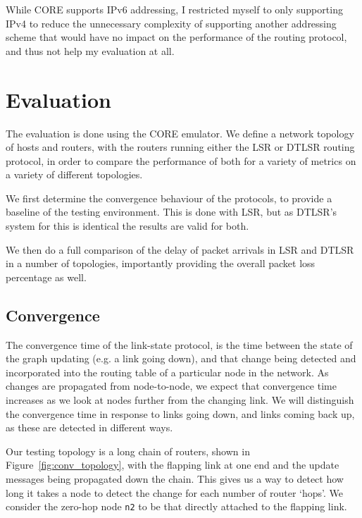 \documentclass[withindex,glossary,openany]{cam-thesis}
\begin{document}
While CORE supports IPv6 addressing, I restricted myself to only supporting IPv4 to reduce the unnecessary complexity of supporting another addressing scheme that would have no impact on the performance of the routing protocol, and thus not help my evaluation at all.


\chapter{Evaluation}

The evaluation is done using the CORE emulator. We define a network topology of hosts and routers, with the routers running either the LSR or DTLSR routing protocol, in order to compare the performance of both for a variety of metrics on a variety of different topologies.

We first determine the convergence behaviour of the protocols, to provide a baseline of the testing environment. This is done with LSR, but as DTLSR's system for this is identical the results are valid for both.

We then do a full comparison of the delay of packet arrivals in LSR and DTLSR in a number of topologies, importantly providing the overall packet loss percentage as well.

\section{Convergence}

The convergence time of the link-state protocol, is the time between the state of the graph updating (e.g. a link going down), and that change being detected and incorporated into the routing table of a particular node in the network. As changes are propagated from node-to-node, we expect that convergence time increases as we look at nodes further from the changing link. We will distinguish the convergence time in response to links going down, and links coming back up, as these are detected in different ways. 

Our testing topology is a long chain of routers, shown in Figure~\ref{fig:conv_topology}, with the flapping link at one end and the update messages being propagated down the chain. This gives us a way to detect how long it takes a node to detect the change for each number of router `hops'. We consider the zero-hop node \texttt{n2} to be that directly attached to the flapping link.
\end{document}
